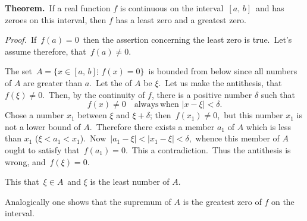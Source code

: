 \documentclass[12pt]{article}
\theoremstyle{definition}
\begin{document}
\textbf{Theorem.}\, If a real function $f$ is continuous on the interval\, $[a,\,b]$\, and has zeroes on this interval, then $f$ has a least zero and a greatest zero.

{\em Proof.}\, If\, $f(a) = 0$\, then the assertion concerning the least zero is true.\, Let's assume therefore, that\, $f(a) \neq 0$.\, 

The set\, $A = \{x\in [a,\,b]\vdots\,\, f(x) = 0\}$\, is bounded from below since all numbers of $A$ are greater than $a$.\, Let the  of $A$ be $\xi$.\, Let us make the antithesis, that\, $f(\xi) \neq 0$.\, Then, by the continuity of $f$, there is a positive number $\delta$ such that
$$f(x) \neq 0\quad \mathrm{always\,when}\,\,|x-\xi| < \delta.$$
Chose a number $x_1$ between $\xi$ and $\xi\!+\!\delta$; then\, $f(x_1) \neq 0$,\, but this number $x_1$ is not a lower bound of $A$.\, Therefore there exists a member $a_1$ of $A$ which is less than $x_1$ ($\xi < a_1 < x_1$).\, Now\, $|a_1-\xi| < |x_1-\xi| < \delta$,\, whence this member of $A$ ought to satisfy that\, $f(a_1) = 0$.\, This  a contradiction.\, Thus the antithesis is wrong, and\, $f(\xi) = 0$.

This  that\, $\xi\in A$\, and $\xi$ is the least number of $A$.

Analogically one shows that the supremum of $A$ is the greatest zero of $f$ on the interval.
\end{document}
